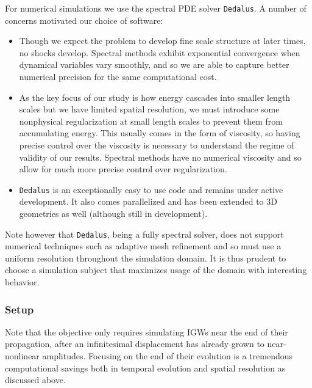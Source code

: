 \documentclass[11pt,
        usenames, %
        dvipsnames %
    ]{article}
\begin{document}
For numerical simulations we use the spectral PDE solver
\lstinline{Dedalus}\cite{dedalus}. A number of concerns motivated our choice of
software:
\begin{itemize}
    \item Though we expect the problem to develop fine scale structure at later
        times, no shocks develop. Spectral methods exhibit exponential
        convergence when dynamical variables vary smoothly\cite{NR}, and so we
        are able to capture better numerical precision for the same
        computational cost.

    \item As the key focus of our study is how energy cascades into smaller
        length scales but we have limited spatial resolution, we must introduce
        some nonphysical regularization at small length scales to prevent them
        from accumulating energy. This usually comes in the form of viscosity,
        so having precise control over the viscosity is necessary to understand
        the regime of validity of our results. Spectral methods have no
        numerical viscosity\cite{NR} and so allow for much more precise control
        over regularization.

    \item \lstinline{Dedalus} is an exceptionally easy to use code and remains
        under active development. It also comes parallelized and has been
        extended to 3D geometries as well (although still in development).
\end{itemize}
Note however that \lstinline{Dedalus}, being a fully spectral solver, does not
support numerical techniques such as adaptive mesh refinement and so must use a
uniform resolution throughout the simulation domain. It is thus prudent to
choose a simulation subject that maximizes usage of the domain with interesting
behavior.

\subsubsection{Setup}

Note that the objective only requires simulating IGWs near the end of their
propagation, after an infinitesimal displacement has already grown to
near-nonlinear amplitudes. Focusing on the end of their evolution is a
tremendous computational savings both in temporal evolution and spatial
resolution as discussed above.
\end{document}
